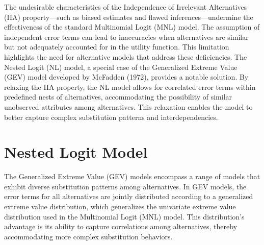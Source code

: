 \documentclass[a4paper,11pt]{article}
\begin{document}
    The undesirable characteristics of the Independence of Irrelevant Alternatives (IIA) property—such as biased estimates and flawed inferences—undermine the effectiveness of the standard Multinomial Logit (MNL) model. The assumption of independent error terms can lead to inaccuracies when alternatives are similar but not adequately accounted for in the utility function. This limitation highlights the need for alternative models that address these deficiencies. The Nested Logit (NL) model, a special case of the Generalized Extreme Value (GEV) model developed by McFadden (1972), provides a notable solution. By relaxing the IIA property, the NL model allows for correlated error terms within predefined nests of alternatives, accommodating the possibility of similar unobserved attributes among alternatives. This relaxation enables the model to better capture complex substitution patterns and interdependencies.

\clearpage

\section{Nested Logit Model}
\label{sec:NL}


    The Generalized Extreme Value (GEV) models encompass a range of models that exhibit diverse substitution patterns among alternatives. In GEV models, the error terms for all alternatives are jointly distributed according to a generalized extreme value distribution, which generalizes the univariate extreme value distribution used in the Multinomial Logit (MNL) model. This distribution's advantage is its ability to capture correlations among alternatives, thereby accommodating more complex substitution behaviors.\\
\end{document}
